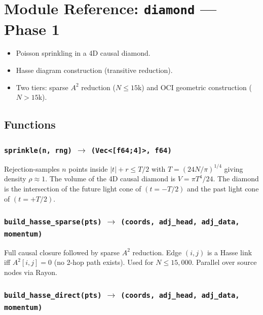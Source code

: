 \documentclass[11pt, a4paper, openany]{book}
\newcommand{\code}[1]{\texttt{#1}}
\newcommand{\func}[1]{\texttt{\color{structure}#1}}
\newcommand{\modname}[1]{\texttt{\bfseries\color{main}#1}}
\newenvironment{introduction}[1][Chapter Overview]{%
  \begin{tcolorbox}[
    enhanced,colback=structure!5,colframe=structure,
    colbacktitle=structure,coltitle=white,
    fonttitle=\small\bfseries,title={#1},
    arc=2pt,boxrule=0.7pt,
    left=8pt,right=8pt,top=6pt,bottom=6pt,
    before skip=12pt,after skip=12pt
  ]\itshape\begin{itemize}[leftmargin=*,itemsep=2pt,parsep=0pt]
}{%
  \end{itemize}\end{tcolorbox}
}
\begin{document}
\chapter{Module Reference: \modname{diamond} --- Phase 1}

\begin{introduction}[Vacuum Generation]
  \item Poisson sprinkling in a 4D causal diamond.
  \item Hasse diagram construction (transitive reduction).
  \item Two tiers: sparse $A^2$ reduction ($N \le 15$k) and OCI geometric construction ($N > 15$k).
\end{introduction}

\section{Functions}

\subsection{\func{sprinkle(n, rng)} $\to$ \code{(Vec<[f64;4]>, f64)}}

Rejection-samples $n$ points inside $|t| + r \le T/2$ with
$T = (24N/\pi)^{1/4}$ giving density $\rho \approx 1$.  The volume of the
4D causal diamond is $V = \pi T^4/24$.  The diamond is the intersection of
the future light cone of $(t = -T/2)$ and the past light cone of $(t = +T/2)$.

\subsection{\func{build\_hasse\_sparse(pts)} $\to$ \code{(coords, adj\_head, adj\_data, momentum)}}

Full causal closure followed by sparse $A^2$ reduction.  Edge $(i,j)$ is a
Hasse link iff $A^2[i,j] = 0$ (no 2-hop path exists).  Used for $N \le
15{,}000$.  Parallel over source nodes via Rayon.

\subsection{\func{build\_hasse\_direct(pts)} $\to$ \code{(coords, adj\_head, adj\_data, momentum)}}
\end{document}
